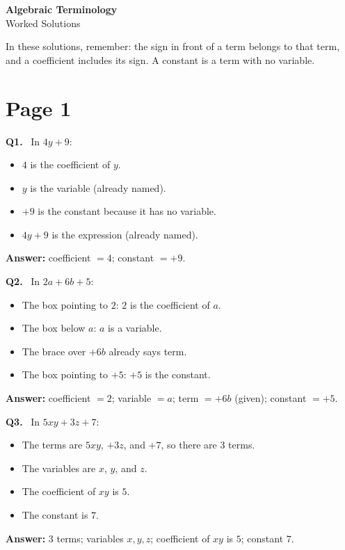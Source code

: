 \documentclass[12pt,a4paper]{article}
\newcommand{\solQ}[1]{\textbf{#1.}\ }
\newcommand{\ans}[1]{\par\noindent\textbf{Answer: }#1\par}
\begin{document}
\raggedright

\begin{center}
  {\LARGE\bfseries Algebraic Terminology}\\[2pt]
  {\large Worked Solutions}
\end{center}

In these solutions, remember: the sign in front of a term belongs to that term, and a coefficient includes its sign. A constant is a term with no variable.

\section*{Page 1}

\begin{solbox}
\solQ{Q1} In \(4y+9\):
\begin{itemize}
  \item \(4\) is the coefficient of \(y\).
  \item \(y\) is the variable (already named).
  \item \(+9\) is the constant because it has no variable.
  \item \(4y+9\) is the expression (already named).
\end{itemize}
\ans{coefficient \(=4\); constant \(=+9\).}
\end{solbox}

\begin{solbox}
\solQ{Q2} In \(2a+6b+5\):
\begin{itemize}
  \item The box pointing to \(2\): \(2\) is the coefficient of \(a\).
  \item The box below \(a\): \(a\) is a variable.
  \item The brace over \(+6b\) already says term.
  \item The box pointing to \(+5\): \(+5\) is the constant.
\end{itemize}
\ans{coefficient \(=2\); variable \(=a\); term \(=+6b\) (given); constant \(=+5\).}
\end{solbox}

\begin{solbox}
\solQ{Q3} In \(5xy+3z+7\):
\begin{itemize}
  \item The terms are \(5xy\), \(+3z\), and \(+7\), so there are \(3\) terms.
  \item The variables are \(x\), \(y\), and \(z\).
  \item The coefficient of \(xy\) is \(5\).
  \item The constant is \(7\).
\end{itemize}
\ans{3 terms; variables \(x,y,z\); coefficient of \(xy\) is \(5\); constant \(7\).}
\end{solbox}
\end{document}
